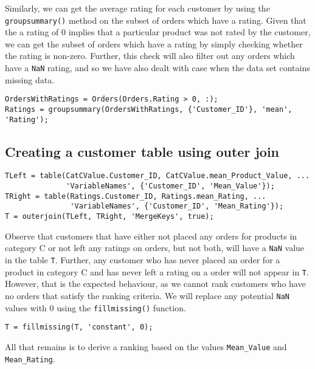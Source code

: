 \noindent
Similarly, we can get the average rating for each customer by using the \lstinline|groupsummary()| method on the subset of orders which have a rating. Given that the a rating of 0 implies that a particular product was not rated by the customer, we can get the subset of orders which have a rating by simply checking whether the rating is non-zero. Further, this check will also filter out any orders which have a \lstinline|NaN| rating, and so we have also dealt with case when the data set contains missing data.

\begin{lstlisting}
OrdersWithRatings = Orders(Orders.Rating > 0, :);
Ratings = groupsummary(OrdersWithRatings, {'Customer_ID'}, 'mean', 'Rating');
\end{lstlisting}

\newpage
\subsection{Creating a customer table using outer join}



\begin{lstlisting}
TLeft = table(CatCValue.Customer_ID, CatCValue.mean_Product_Value, ...
              'VariableNames', {'Customer_ID', 'Mean_Value'});
TRight = table(Ratings.Customer_ID, Ratings.mean_Rating, ...
               'VariableNames', {'Customer_ID', 'Mean_Rating'});
T = outerjoin(TLeft, TRight, 'MergeKeys', true);
\end{lstlisting}

\noindent
Observe that customers that have either not placed any orders for products in category C or not left any ratings on orders, but not both, will have a \lstinline|NaN| value in the table \lstinline|T|. Further, any customer who has never placed an order for a product in category C and has never left a rating on a order will not appear in \lstinline|T|. However, that is the expected behaviour, as we cannot rank customers who have no orders that satisfy the ranking criteria. We will replace any potential \lstinline|NaN| values with 0 using the \lstinline|fillmissing()| function.

\begin{lstlisting}
T = fillmissing(T, 'constant', 0);
\end{lstlisting}

\noindent
All that remains is to derive a ranking based on the values \lstinline|Mean_Value| and \lstinline|Mean_Rating|. \\

